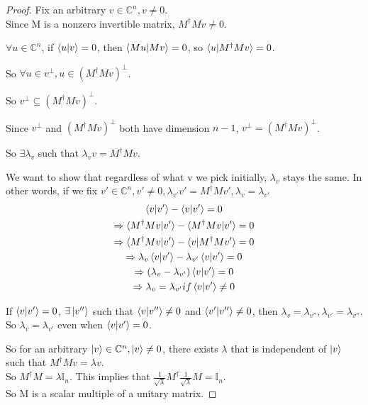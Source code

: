 \begin{proof}
Fix an arbitrary $v \in \mathbb{C}^n, v \ne 0$.\\ Since M is a nonzero invertible matrix, $M^\dagger M v \ne 0$.

$\forall u \in \mathbb{C}^n$, if $\braket{u|v}=0$, then $\braket{Mu|Mv}=0$, so $\braket{u|M^\dagger Mv}=0$.

So $\forall u \in v^\perp, u \in (M^\dagger Mv)^\perp$.

So $v^\perp \subseteq (M^\dagger Mv)^\perp$.

Since $v^\perp$ and $(M^\dagger Mv)^\perp$ both have dimension $n-1$, $v^\perp = (M^\dagger Mv)^\perp$.

So $\exists \lambda_v$ such that $\lambda_v v = M^\dagger M v$.

We want to show that regardless of what v we pick initially, $\lambda_v$ stays the same. In other words, if we fix $v' \in \mathbb{C}^n, v' \ne 0, \lambda_{v'} v' = M^\dagger M v', \lambda_v = \lambda_{v'}$
\begin{gather*}
\braket{v|v'}-\braket{v|v'}=0\\
\Rightarrow \braket{M^\dagger M v|v'}-\braket{M^\dagger M v|v'}=0\\
\Rightarrow \braket{M^\dagger M v|v'}-\braket{v|M^\dagger M v'}=0\\
\Rightarrow \lambda_v \braket{v|v'}-\lambda_{v'} \braket{v|v'}=0\\
\Rightarrow (\lambda_v -\lambda_{v'}) \braket{v|v'}=0\\
\Rightarrow  \lambda_v = \lambda_{v'} if \braket{v|v'} \ne 0
\end{gather*}

If $\braket{v|v'}=0$, $\exists \ket{v''}$ such that $\braket{v|v''} \ne 0$ and $\braket{v'|v''} \ne 0$, then $\lambda_v =\lambda_{v''}, \lambda_{v'}=\lambda_{v''}$.\\
So $\lambda_v=\lambda_{v'}$ even when $\braket{v|v'}=0$.

So for an arbitrary $\ket{v} \in \mathbb{C}^n, \ket{v} \ne 0$, there exists $\lambda$ that is independent of $\ket{v}$ such that $M^\dagger M v = \lambda v$. \\
So $M^\dagger M=\lambda \mathbb{I}_n$. 
This implies that $ \frac{1}{\sqrt{\lambda}}M^\dagger \frac{1}{\sqrt{\lambda}} M=\mathbb{I}_n.$\\
So M is a scalar multiple of a unitary matrix.
\end{proof}



